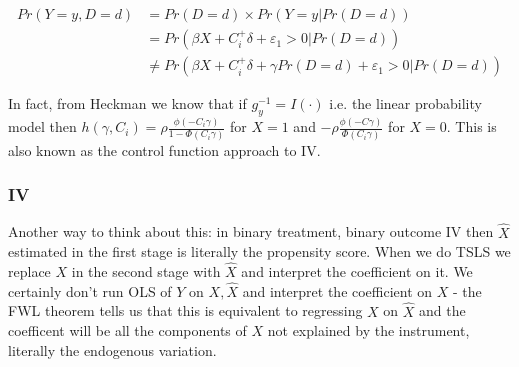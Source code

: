 \documentclass{article}
\begin{document}
\begin{align*}
    Pr(Y = y, D = d) &= Pr(D = d) \times Pr(Y = y | Pr(D = d)) \\
    &= Pr(\beta X + C_i^+\delta + \varepsilon_1 > 0 | Pr(D = d)) \\
    &\neq Pr(\beta X + C_i^+ \delta + \gamma Pr(D = d) + \varepsilon_1 > 0 | Pr(D =  d))
\end{align*}



In fact, 
from Heckman we know that if $g_y^{-1} = I(\cdot)$ i.e. the linear probability model
then $h(\gamma, C_i) = \rho \frac{\phi(-C_i\gamma)}{1 - \Phi(C_i \gamma)}$ for $X = 1$ 
and $-\rho \frac{\phi(-C\gamma)}{\Phi(C_i \gamma)}$ for $X = 0$. This is also known 
as the control function approach to IV.

\subsubsection*{IV}
Another way to think about this: in binary treatment, binary outcome IV then $\hat{X}$ 
estimated in the first stage is literally the  propensity score. When we do TSLS 
we replace $X$ in the second stage with $\hat{X}$ and interpret the coefficient on it. 
We certainly don't run OLS of $Y$ on $X, \hat{X}$ and interpret the coefficient on 
$X$ - the FWL theorem tells us that this is equivalent to regressing $X$ on $\hat{X}$ and 
 the coefficent will be all the components of $X$ not explained by the instrument, 
 literally the endogenous variation.
\end{document}
